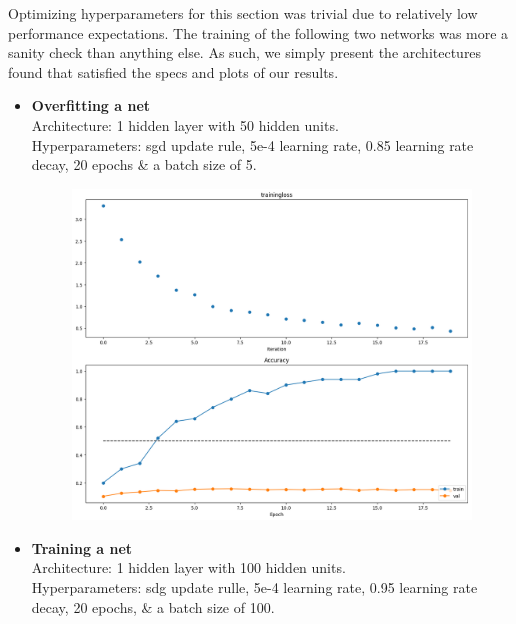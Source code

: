 Optimizing hyperparameters for this section was trivial due to relatively low performance expectations.
The training of the following two networks was more a sanity check than anything else.
As such, we simply present the architectures found that satisfied the specs and plots of our results.
\begin{itemize}[topsep=-15pt, noitemsep, nolistsep]
  
  \item \textbf{Overfitting a net}\\
    Architecture: 1 hidden layer with 50 hidden units.\\
    Hyperparameters: sgd update rule, 5e-4 learning rate, 0.85 learning rate decay, 20 epochs \&  a batch size of 5.
    

    \begin{figure}[!ht]
        \centering
        {{\includegraphics[scale = 0.32]{../nets/overfit_net/diagrams.png}}}  
    \end{figure}

  \item \textbf{Training a net}\\
    Architecture: 1 hidden layer with 100 hidden units.\\
    Hyperparameters: sdg update rulle, 5e-4 learning rate, 0.95 learning rate decay, 20 epochs, \& a batch size of 100.
    
    

\end{itemize}
